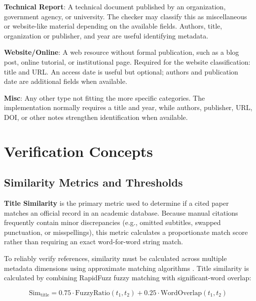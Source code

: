 \documentclass[12pt,a4paper,oneside]{report}
\begin{document}
\textbf{Technical Report}: A technical document published by an organization, government agency, or university. The checker may classify this as miscellaneous or website-like material depending on the available fields. Authors, title, organization or publisher, and year are useful identifying metadata.

\textbf{Website/Online}: A web resource without formal publication, such as a blog post, online tutorial, or institutional page. Required for the website classification: title and URL. An access date is useful but optional; authors and publication date are additional fields when available.

\textbf{Misc}: Any other type not fitting the more specific categories. The implementation normally requires a title and year, while authors, publisher, URL, DOI, or other notes strengthen identification when available.

\section{Verification Concepts}


\subsection{Similarity Metrics and Thresholds}

\textbf{Title Similarity} is the primary metric used to determine if a cited paper matches an official record in an academic database. Because manual citations frequently contain minor discrepancies (e.g., omitted subtitles, swapped punctuation, or misspellings), this metric calculates a proportionate match score rather than requiring an exact word-for-word string match.

To reliably verify references, similarity must be calculated across multiple metadata dimensions using approximate matching algorithms \cite{christen2012}. Title similarity is calculated by combining RapidFuzz fuzzy matching with significant-word overlap:

\begin{equation}
\text{Sim}_{\text{title}} = 0.75 \cdot \text{FuzzyRatio}(t_1, t_2) + 0.25 \cdot \text{WordOverlap}(t_1, t_2)
\end{equation}
\end{document}
